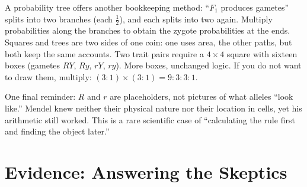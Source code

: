 A probability tree offers another bookkeeping method: ``$F_1$ produces gametes'' splits into two branches (each $\frac{1}{2}$), and each splits into two again. Multiply probabilities along the branches to obtain the zygote probabilities at the ends. Squares and trees are two sides of one coin: one uses area, the other paths, but both keep the same accounts. Two trait pairs require a $4\times4$ square with sixteen boxes (gametes $RY$, $Ry$, $rY$, $ry$). More boxes, unchanged logic. If you do not want to draw them, multiply: $(3:1)\times(3:1)=9:3:3:1$.

One final reminder: $R$ and $r$ are placeholders, not pictures of what alleles ``look like.'' Mendel knew neither their physical nature nor their location in cells, yet his arithmetic still worked. This is a rare scientific case of ``calculating the rule first and finding the object later.''

\section{Evidence: Answering the Skeptics}


